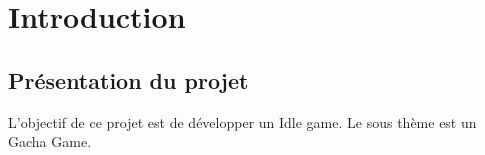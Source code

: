 \section{Introduction}

  \subsection{Présentation du projet}
    L'objectif de ce projet est de développer un Idle game. Le sous thème est un Gacha Game.
